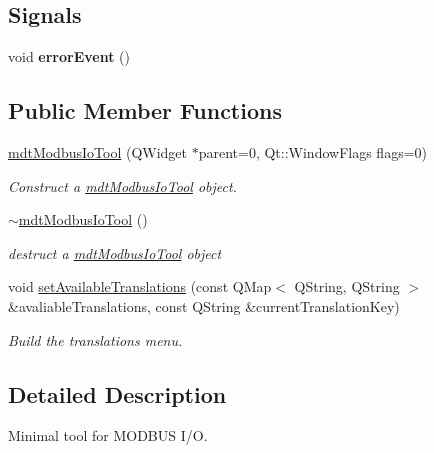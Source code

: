 \subsection*{Signals}
\begin{DoxyCompactItemize}
\item 
\hypertarget{classmdt_modbus_io_tool_a530eb4396b483076be021689b4fc4a9c}{
void {\bfseries errorEvent} ()}
\label{classmdt_modbus_io_tool_a530eb4396b483076be021689b4fc4a9c}

\end{DoxyCompactItemize}
\subsection*{Public Member Functions}
\begin{DoxyCompactItemize}
\item 
\hyperlink{classmdt_modbus_io_tool_a8ce66aaa36a5e1f5569eaf00f01f28c6}{mdtModbusIoTool} (QWidget $\ast$parent=0, Qt::WindowFlags flags=0)
\begin{DoxyCompactList}\small\item\em Construct a \hyperlink{classmdt_modbus_io_tool}{mdtModbusIoTool} object. \end{DoxyCompactList}\item 
\hypertarget{classmdt_modbus_io_tool_a4321c2d67a52e135dba99a053ef26547}{
\hyperlink{classmdt_modbus_io_tool_a4321c2d67a52e135dba99a053ef26547}{$\sim$mdtModbusIoTool} ()}
\label{classmdt_modbus_io_tool_a4321c2d67a52e135dba99a053ef26547}

\begin{DoxyCompactList}\small\item\em destruct a \hyperlink{classmdt_modbus_io_tool}{mdtModbusIoTool} object \end{DoxyCompactList}\item 
\hypertarget{classmdt_modbus_io_tool_a5609881a00e48c8cbd0047c3c6a15ff5}{
void \hyperlink{classmdt_modbus_io_tool_a5609881a00e48c8cbd0047c3c6a15ff5}{setAvailableTranslations} (const QMap$<$ QString, QString $>$ \&avaliableTranslations, const QString \&currentTranslationKey)}
\label{classmdt_modbus_io_tool_a5609881a00e48c8cbd0047c3c6a15ff5}

\begin{DoxyCompactList}\small\item\em Build the translations menu. \end{DoxyCompactList}\end{DoxyCompactItemize}


\subsection{Detailed Description}
Minimal tool for MODBUS I/O. 

